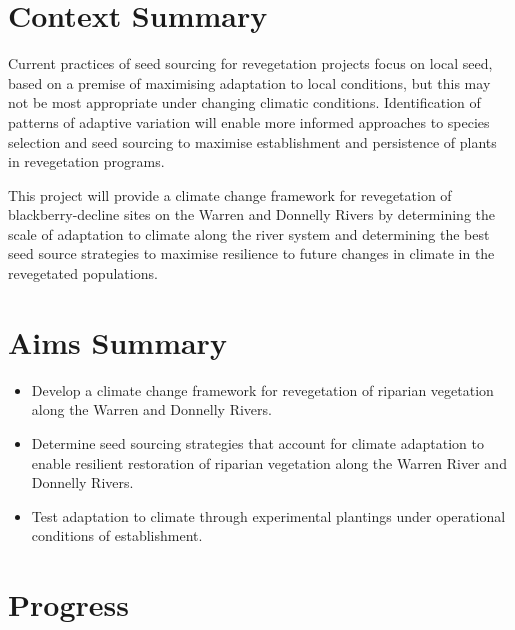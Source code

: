 \documentclass[version=last, paper=a4, DIV=18, usenames, dvipsnames]{scrartcl}
\begin{document}
\section{Context Summary}



Current practices of seed sourcing for revegetation projects focus on local seed, based on a premise of maximising adaptation to local conditions, but this may not be most appropriate under changing climatic conditions. Identification of patterns of adaptive variation will enable more informed approaches to species selection and seed sourcing to maximise establishment and persistence of plants in revegetation programs.


This project will provide a climate change framework for revegetation of blackberry-decline sites on the Warren and Donnelly Rivers by determining the scale of adaptation to climate along the river system and determining the best seed source strategies to maximise resilience to future changes in climate in the revegetated populations.






\section{Aims Summary}



\begin{itemize}

  \item Develop a climate change framework for revegetation of riparian vegetation along the Warren and Donnelly Rivers.

  \item Determine seed sourcing strategies that account for climate adaptation to enable resilient restoration of riparian vegetation along the Warren River and Donnelly Rivers.

  \item Test adaptation to climate through experimental plantings under operational conditions of establishment.

\end{itemize}






\section{Progress}
\end{document}
